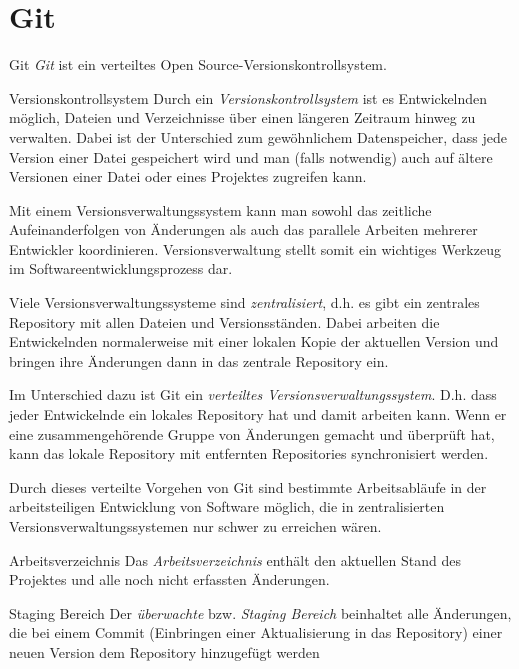 \section{Git}

\begin{defi}{Git}
    \emph{Git} ist ein verteiltes Open Source-Versionskontrollsystem.
\end{defi}

\begin{defi}{Versionskontrollsystem}
    Durch ein \emph{Versionskontrollsystem} ist es Entwickelnden möglich, Dateien und Verzeichnisse über einen längeren Zeitraum hinweg zu verwalten.
    Dabei ist der Unterschied zum gewöhnlichem Datenspeicher, dass jede Version einer Datei gespeichert wird und man (falls notwendig) auch auf ältere Versionen einer Datei oder eines Projektes zugreifen kann.

    Mit einem Versionsverwaltungssystem kann man sowohl das zeitliche Aufeinanderfolgen von Änderungen als auch das parallele Arbeiten mehrerer Entwickler koordinieren.
    Versionsverwaltung stellt somit ein wichtiges Werkzeug im Softwareentwicklungsprozess dar.

    Viele Versionsverwaltungssysteme sind \emph{zentralisiert}, d.h. es gibt ein zentrales Repository mit allen Dateien und Versionsständen.
    Dabei arbeiten die Entwickelnden normalerweise mit einer lokalen Kopie der aktuellen Version und bringen ihre Änderungen dann in das zentrale Repository ein.

    Im Unterschied dazu ist Git ein \emph{verteiltes Versionsverwaltungssystem}.
    D.h. dass jeder Entwickelnde ein lokales Repository hat und damit arbeiten kann.
    Wenn er eine zusammengehörende Gruppe von Änderungen gemacht und überprüft hat, kann das lokale Repository mit entfernten Repositories synchronisiert werden.

    Durch dieses verteilte Vorgehen von Git sind bestimmte Arbeitsabläufe in der arbeitsteiligen Entwicklung von Software möglich, die in zentralisierten Versionsverwaltungssystemen nur schwer zu erreichen wären.
\end{defi}

\begin{defi}{Arbeitsverzeichnis}
    Das \emph{Arbeitsverzeichnis} enthält den aktuellen Stand des Projektes und alle noch nicht erfassten Änderungen.
\end{defi}

\begin{defi}{Staging Bereich}
    Der \emph{überwachte} bzw. \emph{Staging Bereich} beinhaltet alle Änderungen, die bei einem Commit (Einbringen einer Aktualisierung in das Repository) einer neuen Version dem Repository hinzugefügt werden
\end{defi}

